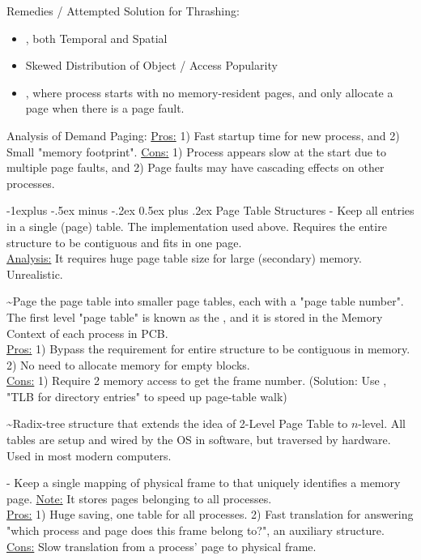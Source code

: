 \documentclass[10pt,landscape,letterpaper]{article}
\makeatletter
\renewcommand{\subsection}{\@startsection{subsection}{2}{0mm}%
                                {-1explus -.5ex minus -.2ex}%
                                {0.5ex plus .2ex}%
                                {\sffamily\normalsize\itshape}}
\makeatother
\begin{document}
\begin{multicols}{3}
\medskip

Remedies / Attempted Solution for Thrashing:
\begin{itemize}
    \item {}, both Temporal and Spatial
    \item Skewed Distribution of Object / Access Popularity
    \item {}, where process starts with no memory-resident pages, and only allocate a page when there is a page fault.
\end{itemize}
Analysis of Demand Paging: \underline{Pros:} 1) Fast startup time for new process, and 2) Small "memory footprint". \underline{Cons:} 1) Process appears slow at the start due to multiple page faults, and 2) Page faults may have cascading effects on other processes.


\subsection{Page Table Structures}
 - Keep all entries in a single (page) table. The implementation used above. Requires the entire structure to be contiguous and fits in one page.
\\
\underline{Analysis:} It requires huge page table size for large (secondary) memory. Unrealistic.

\medskip

 \textasciitilde Page the page table into smaller page tables, each with a "page table number". The first level "page table" is known as the , and it is stored in the Memory Context of each process in PCB.
\\
\underline{Pros:} 1) Bypass the requirement for entire structure to be contiguous in memory. 2) No need to allocate memory for empty blocks.
\\
\underline{Cons:} 1) Require 2 memory access to get the frame number. (Solution: Use , "TLB for directory entries" to speed up page-table walk)

\medskip

 \textasciitilde Radix-tree structure that extends the idea of 2-Level Page Table to $n$-level. All tables are setup and wired by the OS in software, but traversed by hardware. Used in most modern computers.

\medskip

 - Keep a single mapping of physical frame to  that uniquely identifies a memory page. \underline{Note:} It stores pages belonging to all processes.
\\
\underline{Pros:} 1) Huge saving, one table for all processes. 2) Fast translation for answering "which process and page does this frame belong to?", an auxiliary structure.
\underline{Cons:} Slow translation from a process' page to physical frame.


\end{multicols}
\end{document}
